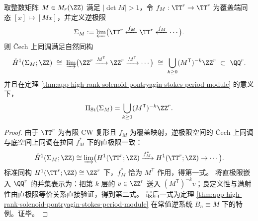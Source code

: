 \begin{proposition}\label{prop:app-toral-solenoid-cech-h1-direct-limit}
取整数矩阵 \(M\in M_r(\ZZ)\) 满足 \(|\det M|>1\)，令 \(f_M:\TT^r\to\TT^r\) 为覆盖端同态 \([x]\mapsto [Mx]\)，并定义逆极限
\[
\Sigma_M:=\varprojlim\bigl(\TT^r\xleftarrow{f_M}\TT^r\xleftarrow{f_M}\cdots\bigr).
\]
则 Čech 上同调满足自然同构
\[
\check H^1(\Sigma_M;\ZZ)\ \cong\ \varinjlim\bigl(\ZZ^r\xrightarrow{M^{\mathsf T}}\ZZ^r\xrightarrow{M^{\mathsf T}}\cdots\bigr)
\ \cong\ \bigcup_{k\ge 0}(M^{\mathsf T})^{-k}\ZZ^r\ \subset\ \QQ^r.
\]
并且在定理 \ref{thm:app-high-rank-solenoid-pontryagin-stokes-period-module} 的意义下，
\[
\Pi_{\mathrm{St}}(\Sigma_M)=\bigcup_{k\ge 0}(M^{\mathsf T})^{-k}\ZZ^r.
\]
\end{proposition}
\begin{proof}
由于 \(\TT^r\) 为有限 CW 复形且 \(f_M\) 为覆盖映射，逆极限空间的 Čech 上同调与底空间上同调在拉回 \(f_M^\ast\) 下的直极限一致：
\[
\check H^1(\Sigma_M;\ZZ)\cong \varinjlim\bigl(H^1(\TT^r;\ZZ)\xrightarrow{f_M^\ast}H^1(\TT^r;\ZZ)\to\cdots\bigr).
\]
标准同构 \(H^1(\TT^r;\ZZ)\cong \ZZ^r\) 下，\(f_M^\ast\) 恰为 \(M^{\mathsf T}\) 作用，得第一式。
将直极限嵌入 \(\QQ^r\) 的并集表示为：把第 \(k\) 层的 \(v\in\ZZ^r\) 送入 \((M^{\mathsf T})^{-k}v\)；良定义性与满射性由直极限等价关系直接验证，得到第二式。
最后一式为定理 \ref{thm:app-high-rank-solenoid-pontryagin-stokes-period-module} 在常值逆系统 \(B_n\equiv M\) 下的特例。证毕。
\end{proof}

\endinput
